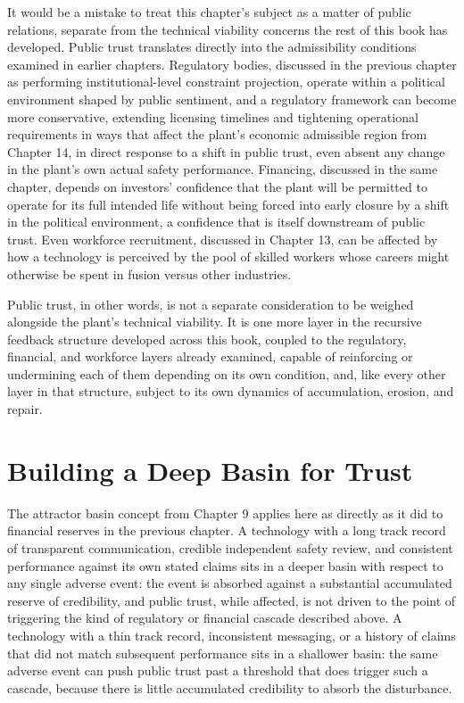 It would be a mistake to treat this chapter's subject as a matter of public relations, separate from the technical viability concerns the rest of this book has developed. Public trust translates directly into the admissibility conditions examined in earlier chapters. Regulatory bodies, discussed in the previous chapter as performing institutional-level constraint projection, operate within a political environment shaped by public sentiment, and a regulatory framework can become more conservative, extending licensing timelines and tightening operational requirements in ways that affect the plant's economic admissible region from Chapter 14, in direct response to a shift in public trust, even absent any change in the plant's own actual safety performance. Financing, discussed in the same chapter, depends on investors' confidence that the plant will be permitted to operate for its full intended life without being forced into early closure by a shift in the political environment, a confidence that is itself downstream of public trust. Even workforce recruitment, discussed in Chapter 13, can be affected by how a technology is perceived by the pool of skilled workers whose careers might otherwise be spent in fusion versus other industries.

Public trust, in other words, is not a separate consideration to be weighed alongside the plant's technical viability. It is one more layer in the recursive feedback structure developed across this book, coupled to the regulatory, financial, and workforce layers already examined, capable of reinforcing or undermining each of them depending on its own condition, and, like every other layer in that structure, subject to its own dynamics of accumulation, erosion, and repair.

\section{Building a Deep Basin for Trust}

The attractor basin concept from Chapter 9 applies here as directly as it did to financial reserves in the previous chapter. A technology with a long track record of transparent communication, credible independent safety review, and consistent performance against its own stated claims sits in a deeper basin with respect to any single adverse event: the event is absorbed against a substantial accumulated reserve of credibility, and public trust, while affected, is not driven to the point of triggering the kind of regulatory or financial cascade described above. A technology with a thin track record, inconsistent messaging, or a history of claims that did not match subsequent performance sits in a shallower basin: the same adverse event can push public trust past a threshold that does trigger such a cascade, because there is little accumulated credibility to absorb the disturbance.

